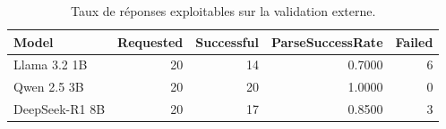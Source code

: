 \begin{table}[!htbp]
\caption{Taux de réponses exploitables sur la validation externe.}
\label{tab:external_parse_success}
\begin{tabular}{lrrrr}
\toprule
Model & Requested & Successful & ParseSuccessRate & Failed \\
\midrule
Llama 3.2 1B & 20 & 14 & 0.7000 & 6 \\
Qwen 2.5 3B & 20 & 20 & 1.0000 & 0 \\
DeepSeek-R1 8B & 20 & 17 & 0.8500 & 3 \\
\bottomrule
\end{tabular}
\end{table}
